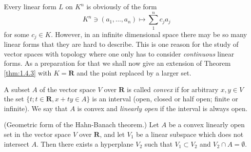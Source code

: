 Every linear form $L$ on $K^n$ is obviously of the form
\begin{displaymath}
  K^n\ni (a_1,\ldots,a_n)\mapsto \sum_1^nc_ja_j
\end{displaymath}
for some $c_j\in K$. However, in an infinite dimensional space there
may be so many linear forms that they are hard to describe. This is
one reason for the study of vector spaces with topology where one only
has to consider \emph{continuous} linear forms. As a preparation for
that we shall now give an extension of Theorem \ref{thm:1.4.3} with
$K=\mathbf{R}$ and the point replaced by a larger set.
\begin{dfn}
  A subset $A$ of the vector space $V$ over $\mathbf{R}$ is called
  \emph{convex} if for arbitrary $x,y\in V$ the set $\{t;t\in
  \mathbf{R},x+ty\in A\}$ is an interval (open, closed or half open;
  finite or infinite). We say that $A$ is convex and \emph{linearly
    open} if the interval is always open.
\end{dfn}
\begin{thm}
  (Geometric form of the Hahn-Banach theorem.) Let $A$ be a convex
  linearly open set in the vector space $V$ over $\mathbf{R}$, and let
  $V_1$ be a linear subspace which does not intersect $A$. Then there
  exists a hyperplane $V_2$ such that $V_1\subset V_2$ and $V_2\cap
  A=\emptyset$.
\end{thm}
